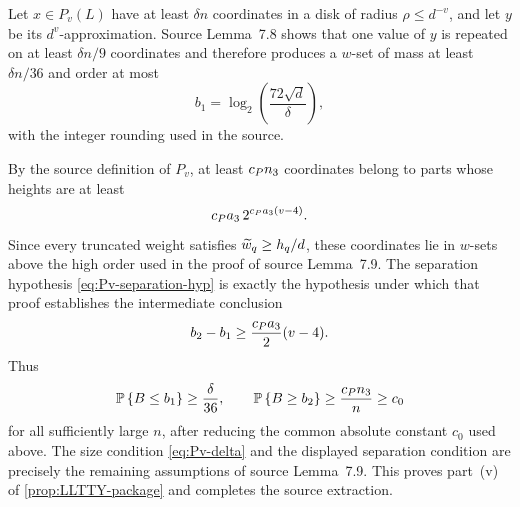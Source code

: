 Let $x\in P_v(L)$ have at least $\delta n$ coordinates in a disk of radius $\rho\le d^{-v}$, and let $y$ be its $d^v$-approximation. Source Lemma~7.8 shows that one value of $y$ is repeated on at least $\delta n/9$ coordinates and therefore produces a $w$-set of mass at least $\delta n/36$ and order at most
\[
  b_1=\log_2\left(\frac{72\sqrt d}{\delta}\right),
\]
with the integer rounding used in the source.

By the source definition of $P_v$, at least $c_P n_3$ coordinates belong to parts whose heights are at least
\[
  c_P a_3\,2^{c_P a_3(v-4)}.
\]
Since every truncated weight satisfies $\widetilde w_q\ge h_q/d$, these coordinates lie in $w$-sets above the high order used in the proof of source Lemma~7.9. The separation hypothesis \eqref{eq:Pv-separation-hyp} is exactly the hypothesis under which that proof establishes the intermediate conclusion
\[
  b_2-b_1\ge\frac{c_P a_3}{2}(v-4).
\]
Thus
\[
  \mathbb P\left\{B\le b_1\right\}\ge\frac\delta{36},
  \qquad
  \mathbb P\left\{B\ge b_2\right\}\ge\frac{c_P n_3}{n}\ge c_0
\]
for all sufficiently large $n$, after reducing the common absolute constant $c_0$ used above. The size condition \eqref{eq:Pv-delta} and the displayed separation condition are precisely the remaining assumptions of source Lemma~7.9. This proves part~(v) of \cref{prop:LLTTY-package} and completes the source extraction.
